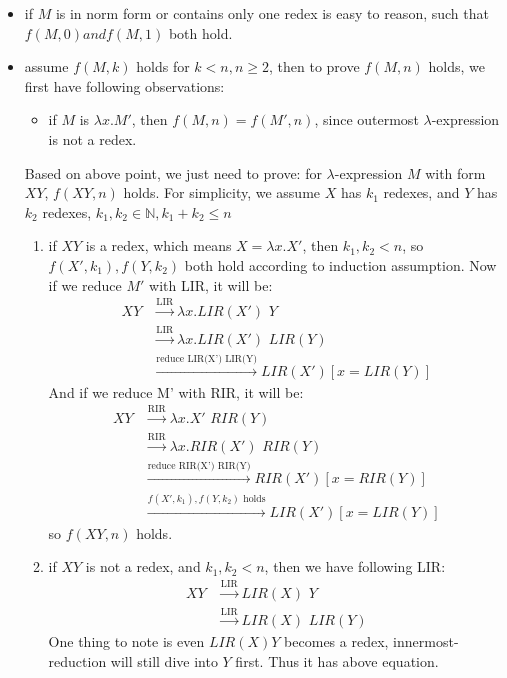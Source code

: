 \documentclass[paper=a4, fontsize=11pt]{scrartcl} %
\numberwithin{equation}{section} %
\numberwithin{figure}{section} %
\numberwithin{table}{section} %
\begin{document}
\begin{itemize}
  \item if $M$ is in norm form or contains only one redex is easy to reason, such that $f(M,0) and f(M,1)$ both hold.
  \item assume $f(M,k)$ holds for $k < n, n \geq 2$, then to prove $f(M,n)$ holds, we first have following observations:\\
    \begin{itemize}
      \item if $M$ is $\lambda x. M'$, then $f(M,n) = f(M',n)$, since outermost $\lambda$-expression is not a redex.
    \end{itemize}
    Based on above point, we just need to prove: for $\lambda$-expression $M$ with form $XY$, $f(XY,n)$ holds. For simplicity, we assume $X$ has $k_1$ redexes, and $Y$ has $k_2$ redexes, $k_1,k_2 \in \mathbb{N}, k_1 + k_2 \leq n$
    \begin{enumerate}
      \item if $XY$ is a redex, which means $X=\lambda x. X'$, then $k_1,k_2 <n$, so $f(X',k_1), f(Y,k_2)$ both hold according to induction assumption. 
	Now if we reduce $M'$ with LIR, it will be:
	\begin{align*}
	  XY & \xrightarrow{\text{LIR}} \lambda x. LIR(X')\,\,Y\\
	     & \xrightarrow{\text{LIR}} \lambda x. LIR(X')\,\,LIR(Y)\\
	     & \xrightarrow{\text{reduce LIR(X') LIR(Y)}} LIR(X') [x=LIR(Y)]
	\end{align*}
	And if we reduce M' with RIR, it will be:
	\begin{align*}
	  XY & \xrightarrow{\text{RIR}} \lambda x. X'\,\,RIR(Y)\\
	     & \xrightarrow{\text{RIR}} \lambda x. RIR(X')\,\,RIR(Y)\\
	     & \xrightarrow{\text{reduce RIR(X') RIR(Y)}} RIR(X') [x=RIR(Y)]\\
	     & \xrightarrow{\text{$f(X',k_1), f(Y,k_2)$ holds}} LIR(X') [x=LIR(Y)]
	\end{align*}
	so $f(XY,n)$ holds.
      \item if $XY$ is not a redex, and $k_1, k_2 < n$, then we have following LIR: 
	\begin{align*}
	  XY & \xrightarrow{\text{LIR}} LIR(X)\,\,Y\\
	     & \xrightarrow{\text{LIR}} LIR(X)\,\,LIR(Y)
	\end{align*}
	One thing to note is even $LIR(X) Y$ becomes a redex, innermost-reduction will still dive into $Y$ first. Thus it has above equation.\\

\end{enumerate}
\end{itemize}
\end{document}
